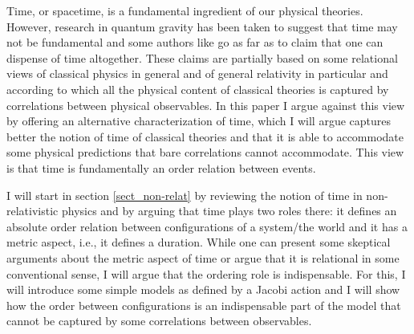 \documentclass[12 pt]{article}
\begin{document}
Time, or spacetime, is a fundamental ingredient of our physical theories. However, research in quantum gravity has been taken to suggest that time may not be fundamental and some authors like \citep{Rovelli2011} go as far as to claim that one can dispense of time altogether. These claims are partially based on some relational views of classical physics in general and of general relativity in particular and according to which all the physical content of classical theories is captured by correlations between physical observables. In this paper I argue against this view by offering an alternative characterization of time, which I will argue captures better the notion of time of classical theories and that it is able to accommodate some physical predictions that bare correlations cannot accommodate. This view is that time is fundamentally an order relation between events.



I will start in section \ref{sect_non-relat} by reviewing the notion of time in non-relativistic physics and by arguing that time plays two roles there: it defines an absolute order relation between configurations of a system/the world and it has a metric aspect, i.e., it defines a duration. While one can present some skeptical arguments about the metric aspect of time or argue that it is relational in some conventional sense, I will argue that the ordering role is indispensable. For this, I will introduce some simple models as defined by a Jacobi action and I will show how the order between configurations is an indispensable part of the model that cannot be captured by some correlations between observables.
\end{document}
